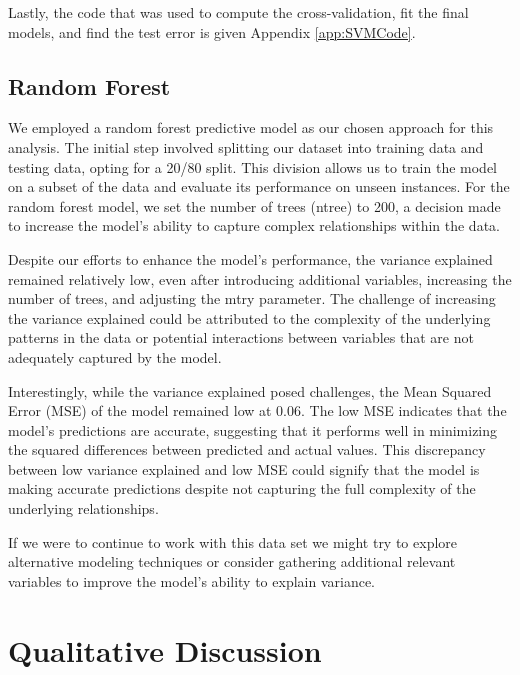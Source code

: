 \documentclass{article}
\begin{document}
    Lastly, the code that was used to compute the cross-validation, fit the final models, and find the test error is given  Appendix \ref{app:SVMCode}.
	

    \subsection{Random Forest}
    \hspace{\parindent} 

We employed a random forest predictive model as our chosen approach for this analysis. The initial step involved splitting our dataset into training data and testing data, opting for a 20/80 split. This division allows us to train the model on a subset of the data and evaluate its performance on unseen instances. For the random forest model, we set the number of trees (ntree) to 200, a decision made to increase the model's ability to capture complex relationships within the data.

Despite our efforts to enhance the model's performance, the variance explained remained relatively low, even after introducing additional variables, increasing the number of trees, and adjusting the mtry parameter. The challenge of increasing the variance explained could be attributed to the complexity of the underlying patterns in the data or potential interactions between variables that are not adequately captured by the model.

Interestingly, while the variance explained posed challenges, the Mean Squared Error (MSE) of the model remained low at 0.06. The low MSE indicates that the model's predictions are accurate, suggesting that it performs well in minimizing the squared differences between predicted and actual values. This discrepancy between low variance explained and low MSE could signify that the model is making accurate predictions despite not capturing the full complexity of the underlying relationships.

If we were to continue to work with this data set we might try to explore alternative modeling techniques  or consider gathering additional relevant variables to improve the model's ability to explain variance. 
    
\section{Qualitative Discussion}
\hspace{\parindent} 
\end{document}
